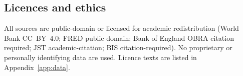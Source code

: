 \subsection{Licences and ethics}

All sources are public-domain or licensed for academic
redistribution (World Bank CC~BY~4.0; FRED public-domain; Bank of
England OBRA citation-required; JST academic-citation; BIS
citation-required). No proprietary or personally identifying data
are used. Licence texts are listed in Appendix~\ref{app:data}.
